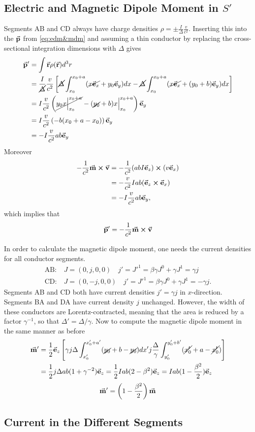 \documentclass[11pt]{amsart}
\begin{document}
\subsection{Electric and Magnetic Dipole Moment in $S'$}
Segments AB and CD always have charge densities $\rho = \pm\frac{I}{\Delta}\frac{v}{c^2}$. Inserting this into the $\va{p}$ from \ref{eq:edm&mdm} and assuming a thin conductor by replacing the cross-sectional integration dimensions with $\Delta$ gives
\begin{align*}
\va{p}'  &= \int\va{r}\rho(\va{r})d^3r \\
		&= \frac{I}{\cancel{\Delta}}\frac{v}{c^2}
		\left[
		 \cancel{\Delta}\int_{x_0}^{x_0+a}(\cancel{x\va{e}_x} + y_0\va{e}_y)dx 
		-\cancel{\Delta}\int_{x_0}^{x_0+a}(\cancel{x\va{e}_x} + (y_0 + b)\va{e}_y)dx 
		\right] \\
		&= I \frac{v}{c^2}\left(
		\cancel{y_0 x\Big|_{x_0}^{x_0 + a}}
		-(\cancel{y_0} + b)x\Big|_{x_0}^{x_0 + a}
		\right)\va{e}_y \\
		&= I \frac{v}{c^2}\left(-b(x_0 + a - x_0)\right)\va{e}_y \\
		&= -I\frac{v}{c^2}ab\va{e}_y
\end{align*}
Moreover
\begin{align*}
-\frac{1}{c^2}\va{m} \cp \va{v} &= -\frac{1}{c^2}(abI\va{e}_z) \cp (v\va{e}_x) \\
			&= -\frac{v}{c^2}Iab (\va{e}_z \cp \va{e}_x) \\
			&= -I \frac{v}{c^2}ab\va{e}_y,
\end{align*}
which implies that
\begin{equation}
\va{p}' = - \frac{1}{c^2}\va{m} \cp \va{v}
\end{equation}

In order to calculate the magnetic dipole moment, one needs the current densities for all conductor segments.
\begin{align*}
\text{AB:} &\ J = (0, j, 0, 0) \quad j' = J'^1 = \beta\gamma J^0 + \gamma J^1 = \gamma j \\
\text{CD:} &\ J = (0, -j, 0, 0) \quad j' = J'^1 = \beta\gamma J^0 + \gamma J^1 = -\gamma j.
\end{align*}
Segments AB and CD both have current densities $j' = \gamma j$ in $x$-direction. Segments BA and DA have current density $j$ unchanged. However, the width of these conductors are Lorentz-contracted, meaning that the area is reduced by a factor $\gamma^{-1}$, so that $\Delta' = \Delta / \gamma$. Now to compute the magnetic dipole moment in the same manner as before
\begin{align*}
\va{m}' &= \frac{1}{2}\va{e}_z\left[
	\gamma j \Delta \int_{x_0'}^{x_0' + a'} (\cancel{y_0} + b - \cancel{y_0})dx' 
	j \frac{\Delta}{\gamma} \int_{y_0'}^{y_0' + b'} (\cancel{x_0'} + a - \cancel{x_0'})
	\right] \\
	&= \frac{1}{2} j \Delta ab (1 + \gamma^{-2})\va{e}_z = \frac{1}{2} I ab (2 - \beta^2)\va{e}_z = I ab (1 - \frac{\beta^2}{2})\va{e}_z
\end{align*}
\begin{equation}
\va{m}' = \left(1 - \frac{\beta^2}{2} \right)\va{m}
\end{equation}

\subsection{Current in the Different Segments}
\end{document}
